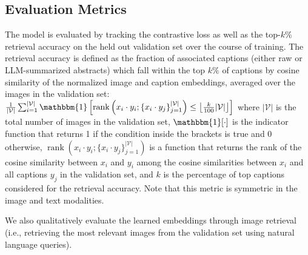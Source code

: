 \documentclass{article} %
\begin{document}
   \subsection{Evaluation Metrics}
   \label{sec:eval}
   
   The model is evaluated by tracking the contrastive loss as well as the top-$k\%$ retrieval accuracy on the held out validation set over the course of training.
   The retrieval accuracy is defined as the fraction of associated captions (either raw or LLM-summarized abstracts) which fall within the top $k\%$ of captions by cosine similarity of the normalized image and caption embeddings, averaged over the images in the validation set:
   $\frac{1}{|\mathcal V|} \sum_{i=1}^{|\mathcal V|} \mathbbm{1}\left[\operatorname{rank}\left({x}_i \cdot {y}_{i}; \{{x}_i \cdot {y}_{j}\}_{j=1}^{|\mathcal V|}\right) \leq \left\lfloor\frac{k}{100}|\mathcal V|\right\rfloor\right]$
   where $|\mathcal V|$ is the total number of images in the validation set, $\mathbbm{1}[\cdot]$ is the indicator function that returns 1 if the condition inside the brackets is true and 0 otherwise, $\operatorname{rank}\left({x}_i \cdot {y}_{i}; \{{x}_i \cdot {y}_{j}\}_{j=1}^{|\mathcal V|}\right)$ is a function that returns the rank of the cosine similarity between ${x}_i$ and ${y}_{i}$ among the cosine similarities between ${x}_i$ and all captions ${y}_j$ in the validation set, and $k$ is the percentage of top captions considered for the retrieval accuracy. Note that this metric is symmetric in the image and text modalities.
   
   We also qualitatively evaluate the learned embeddings through image retrieval (i.e., retrieving the most relevant images from the validation set using natural language queries). %
   
\end{document}
